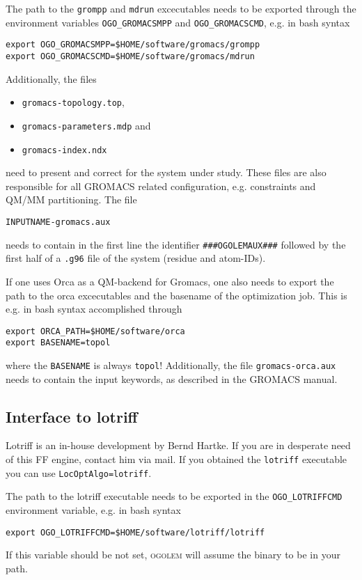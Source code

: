 \documentclass[a4paper,10pt]{scrbook}
\newcommand{\ogo}{\textsc{ogolem}}
\begin{document}
The path to the \texttt{grompp} and \texttt{mdrun} excecutables needs to be
exported through the environment variables \texttt{OGO\_GROMACSMPP} and
\texttt{OGO\_GROMACSCMD}, e.g. in bash syntax
\begin{verbatim}
export OGO_GROMACSMPP=$HOME/software/gromacs/grompp
export OGO_GROMACSCMD=$HOME/software/gromacs/mdrun
\end{verbatim}

Additionally, the files 
\begin{itemize}
\item \texttt{gromacs-topology.top},
\item \texttt{gromacs-parameters.mdp} and
\item \texttt{gromacs-index.ndx}
\end{itemize}
need to present and correct for the system under study. These files are also
responsible for all GROMACS related configuration, e.g. constraints and QM/MM
partitioning. The file
\begin{verbatim}
INPUTNAME-gromacs.aux
\end{verbatim}
needs to contain in the first line the identifier \texttt{\#\#\#OGOLEMAUX\#\#\#}
followed by the first half of a \texttt{.g96} file of the system (residue and
atom-IDs).

If one uses Orca as a QM-backend for Gromacs, one also needs to export the path
to the orca excecutables and the basename of the optimization job. This is e.g.
in bash syntax accomplished through
\begin{verbatim}
export ORCA_PATH=$HOME/software/orca
export BASENAME=topol
\end{verbatim}
where the \texttt{BASENAME} is always \texttt{topol}! Additionally, the file
\texttt{gromacs-orca.aux} needs to contain the input keywords, as described in
the GROMACS manual.

\subsection{Interface to lotriff}
Lotriff is an in-house development by Bernd Hartke. If you are in desperate need
of this FF engine, contact him via mail. If you obtained the \texttt{lotriff}
executable you can use \texttt{LocOptAlgo=lotriff}.

The path to the lotriff executable needs to be exported in the
\texttt{OGO\_LOTRIFFCMD} environment variable, e.g. in bash syntax
\begin{verbatim}
export OGO_LOTRIFFCMD=$HOME/software/lotriff/lotriff
\end{verbatim}
If this variable should be not set, \ogo{} will assume the binary to be in
your path.
\end{document}
